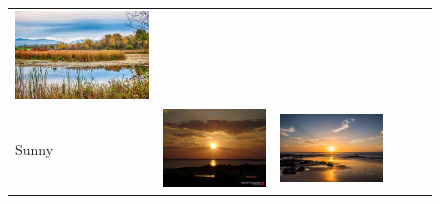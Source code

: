 \begin{figure}
\begin{tabular}{m{.01\linewidth} m{.16\linewidth} m{.16\linewidth} m{.16\linewidth} m{.16\linewidth} m{.16\linewidth}}
    \includegraphics[width=\linewidth]{../style/figures/flickr_on_flickr/pred_style_Serene/4.jpg} \\
    \begin{turn}{90}{Sunny}\end{turn} &
    \includegraphics[width=\linewidth]{../style/figures/flickr_on_flickr/pred_style_Sunny/0.jpg} &
    \includegraphics[width=\linewidth]{../style/figures/flickr_on_flickr/pred_style_Sunny/1.jpg} &

\end{tabular}
\end{figure}

